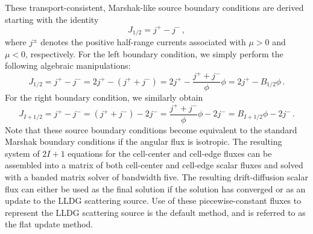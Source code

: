 These transport-consistent, Marshak-like source boundary conditions are derived starting with the identity
\begin{equation}
J_{1/2}=j^+ - j^- \,,
\end{equation}
where $j^\pm$ denotes the positive half-range currents associated with $\mu >0$ and $\mu <0$, respectively.  For the left boundary condition, we simply perform the following algebraic manipulations:
\begin{equation}
J_{1/2} = j^+ - j^-  = 2j^+ - (j^+ + j^-) = 2j^+ - \frac{j^+ + j^-}{\phi} \phi = 2j^+ - B_{1/2} \phi  \, .
\end{equation}
For the right boundary condition, we similarly obtain
\begin{equation}
J_{I+1/2} = j^+ - j^-  = (j^+ + j^-) - 2j^- = \frac{j^+ + j^-}{\phi} \phi - 2j^- = B_{I+1/2} \phi - 2j^-\, .
\end{equation}
Note that these source boundary conditions become equivalent to the standard Marshak boundary conditions if the \SN angular flux 
is isotropic. 
The resulting system of $2I+1$ equations for the cell-center and cell-edge fluxes can be assembled into a matrix of both cell-center and cell-edge scalar fluxes and solved with a banded matrix solver of bandwidth five. The resulting drift-diffusion scalar flux can either be used as the final solution if the solution has converged or as an update to the LLDG \SN scattering source. Use of these piecewise-constant fluxes to represent the LLDG \SN scattering source is the default method, and is referred to as the flat update method.

	
